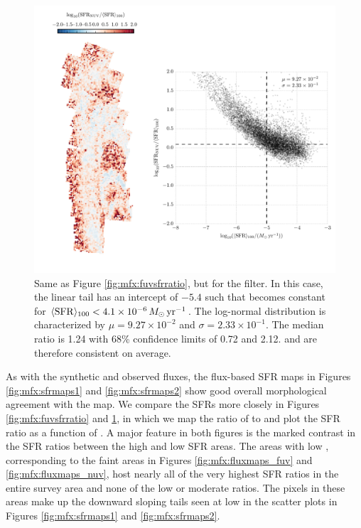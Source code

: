 \documentclass[iop, tighten]{emulateapj}
\begin{document}
\begin{figure}
\centering
\includegraphics[width=\textwidth]{m31flux-figures/sfr_nuv-vs-mean.pdf}
\caption[Ratio of the \sfr{} based on the observed extinction-corrected \nuv{}
flux to the $100\myr$ mean \sfr{}.]{Same as Figure \ref{fig:mfx:fuvsfrratio},
    but for the \nuv{} filter. In this case, the linear tail has an intercept
    of $-5.4$ such that \sfrnuv{} becomes constant for $\langle\mathrm{SFR}\rangle_{100} < 4.1\times
    10^{-6}\,M_\odot\,\mathrm{yr}^{-1}$. The log-normal distribution is characterized by $\mu
    = 9.27\times 10^{-2}$ and $\sigma = 2.33\times 10^{-1}$. The median ratio
    is 1.24 with 68\% confidence limits of 0.72 and 2.12. \sfrnuv{} and
    \sfroneh{} are therefore consistent on average.
}
\label{fig:mfx:nuvsfrratio}
\end{figure}


As with the synthetic and observed fluxes, the flux-based SFR maps in Figures
\ref{fig:mfx:sfrmaps1} and \ref{fig:mfx:sfrmaps2} show good overall
morphological agreement with the \sfroneh{} map. We compare the SFRs more
closely in Figures \ref{fig:mfx:fuvsfrratio} and \ref{fig:mfx:nuvsfrratio}, in
which we map the ratio of \sfrx{} to \sfroneh{} and plot the SFR ratio as a
function of \sfroneh{}. A major feature in both figures is the marked contrast
in the SFR ratios between the high and low SFR areas. The areas with low
\sfroneh{}, corresponding to the faint areas in Figures
\ref{fig:mfx:fluxmaps_fuv} and \ref{fig:mfx:fluxmaps_nuv}, host nearly all of
the very highest SFR ratios in the entire survey area and none of the low or
moderate ratios. The pixels in these areas make up the downward sloping tails
seen at low \sfroneh{} in the scatter plots in Figures \ref{fig:mfx:sfrmaps1}
and \ref{fig:mfx:sfrmaps2}.
\end{document}
